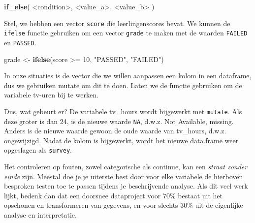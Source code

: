 \documentclass[]{tufte-book}
\newenvironment{Shaded}{}{}
\newcommand{\DataTypeTok}[1]{\textcolor[rgb]{0.56,0.13,0.00}{#1}}
\newcommand{\DecValTok}[1]{\textcolor[rgb]{0.25,0.63,0.44}{#1}}
\newcommand{\KeywordTok}[1]{\textcolor[rgb]{0.00,0.44,0.13}{\textbf{#1}}}
\newcommand{\NormalTok}[1]{#1}
\newcommand{\OperatorTok}[1]{\textcolor[rgb]{0.40,0.40,0.40}{#1}}
\newcommand{\OtherTok}[1]{\textcolor[rgb]{0.00,0.44,0.13}{#1}}
\newcommand{\StringTok}[1]{\textcolor[rgb]{0.25,0.44,0.63}{#1}}
\begin{document}
\begin{Shaded}
\begin{Highlighting}[]
\KeywordTok{if_else}\NormalTok{( }\OperatorTok{<}\NormalTok{condition}\OperatorTok{>}\NormalTok{, }\OperatorTok{<}\NormalTok{value_a}\OperatorTok{>}\NormalTok{, }\OperatorTok{<}\NormalTok{value_b}\OperatorTok{>}\StringTok{ }\NormalTok{)}
\end{Highlighting}
\end{Shaded}

Stel, we hebben een vector \texttt{score} die leerlingenscores bevat. We kunnen de \texttt{ifelse} functie gebruiken om een vector \texttt{grade} te maken met de waarden \texttt{FAILED} en \texttt{PASSED}.

\begin{Shaded}
\begin{Highlighting}[]
\NormalTok{grade <-}\StringTok{ }\KeywordTok{ifelse}\NormalTok{(score }\OperatorTok{>=}\StringTok{ }\DecValTok{10}\NormalTok{, }\StringTok{"PASSED"}\NormalTok{, }\StringTok{"FAILED"}\NormalTok{)}
\end{Highlighting}
\end{Shaded}

In onze situaties is de vector die we willen aanpassen een kolom in een dataframe, dus we gebruiken mutate om dit te doen. Laten we de functie gebruiken om de variabele tv-uren bij te werken.

\begin{Shaded}
\end{Shaded}

Dus, wat gebeurt er? De variabele tv\_hours wordt bijgewerkt met \texttt{mutate}. Als deze groter is dan 24, is de nieuwe waarde \texttt{NA}, d.w.z. Not Available, missing. Anders is de nieuwe waarde gewoon de oude waarde van tv\_hours, d.w.z. ongewijzigd. Nadat de kolom is bijgewerkt, wordt het nieuwe data.frame weer opgeslagen als \texttt{survey}.

Het controleren op fouten, zowel categorische als continue, kan een \emph{straat zonder einde} zijn. Meestal doe je je uiterste best door voor elke variabele de hierboven besproken testen toe te passen tijdens je beschrijvende analyse. Als dit veel werk lijkt, bedenk dan dat een doorsnee dataproject voor 70\% bestaat uit het opschonen en transformeren van gegevens, en voor slechts 30\% uit de eigenlijke analyse en interpretatie.
\end{document}
